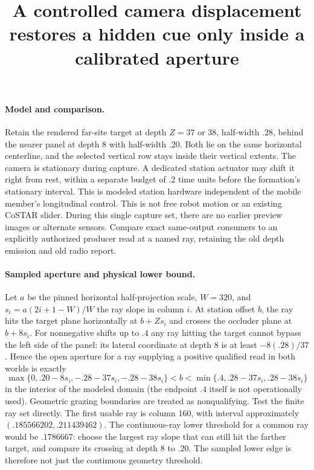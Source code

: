 \documentclass{article}
\begin{document}
\title{A controlled camera displacement restores a hidden cue only inside a calibrated aperture}
\maketitle

\paragraph{Model and comparison.}
Retain the rendered far-site target at depth $Z=37$ or $38$,
half-width $.28$, behind the nearer panel at depth 8 with half-width
$.20$. Both lie on the same horizontal centerline, and the selected
vertical row stays inside their vertical extents. The camera is
stationary during capture. A dedicated station actuator may shift it
right from rest, within a separate budget of $.2$ time units before
the formation's stationary interval. This is modeled station hardware
independent of the mobile member's longitudinal control. This is not
free robot motion or an existing CoSTAR slider. During this single
capture set, there are no earlier preview images or alternate sensors.
Compare exact same-output consumers to an explicitly authorized
producer read at a named ray, retaining the old depth emission and old
radio report.

\paragraph{Sampled aperture and physical lower bound.}
Let $a$ be the pinned horizontal half-projection scale, $W=320$, and
$s_i=a(2i+1-W)/W$ the ray slope in column $i$. At station offset $b$,
the ray hits the target plane horizontally at $b+Zs_i$ and crosses
the occluder plane at $b+8s_i$. For nonnegative shifts up to $.4$ any
ray hitting the target cannot bypass the left side of the panel:
its lateral coordinate at depth 8 is at least $-8(.28)/37$.
Hence the open aperture for a ray supplying a positive qualified
read in both worlds is exactly
\[
  \max\{0,.20-8s_i,-.28-37s_i,-.28-38s_i\}
   < b <
  \min\{.4,.28-37s_i,.28-38s_i\}
\]
in the interior of the modeled domain (the endpoint $.4$ itself is
not operationally used). Geometric grazing boundaries are treated
as nonqualifying. Test the finite ray set directly. The first usable
ray is column 160, with interval approximately
$(.185566202,.211439462)$. The continuous-ray lower threshold for
a common ray would be $.1786667$: choose the largest ray slope
that can still hit the farther target, and compare its crossing at
depth 8 to $.20$. The sampled lower edge is therefore not just the
continuous geometry threshold.
\end{document}
